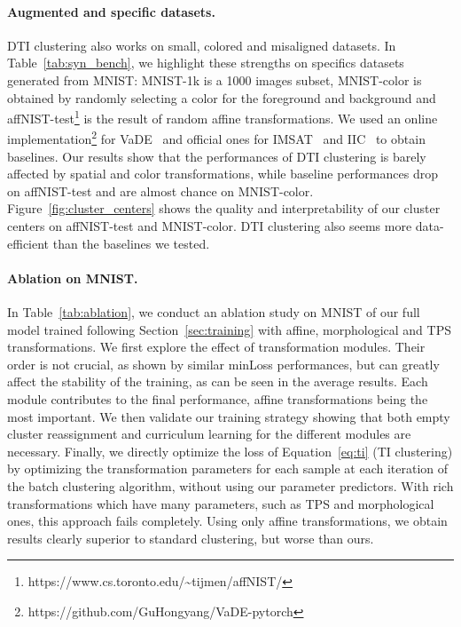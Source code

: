 \documentclass{article}
\begin{document}
\vspace{-0.7em}
\paragraph{Augmented and specific datasets.}
DTI clustering also works on small, colored and misaligned datasets. In 
Table~\ref{tab:syn_bench}, we highlight these strengths on specifics datasets generated from 
MNIST: MNIST-1k is a 1000 images subset, MNIST-color is obtained by randomly selecting a 
color for the foreground and background and 
affNIST-test\footnote{https://www.cs.toronto.edu/\textasciitilde tijmen/affNIST/} is the 
result of random affine transformations.  We used an online 
implementation\footnote{https://github.com/GuHongyang/VaDE-pytorch} for 
VaDE~\cite{jiangVariationalDeepEmbedding2017} and official ones for 
IMSAT~\cite{huLearningDiscreteRepresentations2017} and 
IIC~\cite{jiInvariantInformationClustering2019} to obtain baselines.  Our results show that 
the performances of DTI clustering is barely affected by spatial and color transformations, 
while baseline performances drop on affNIST-test and are almost chance on MNIST-color.  
Figure~\ref{fig:cluster_centers} shows the quality and interpretability of our cluster 
centers on affNIST-test and MNIST-color. DTI clustering also seems more data-efficient than 
the baselines we tested.

\vspace{-0.7em}
\paragraph{Ablation on MNIST.}
In Table~\ref{tab:ablation}, we conduct an ablation study on MNIST of our full model trained 
following Section~\ref{sec:training} with affine, morphological and TPS transformations.
We first explore the effect of transformation modules. Their order is not crucial, as shown 
by similar minLoss performances, but can greatly affect the stability of the training, as can 
be seen in the average results. Each module contributes to the final performance, affine 
transformations being the most important. We then validate our training strategy showing that 
both empty cluster reassignment and curriculum learning for the different modules are 
necessary. Finally, we directly optimize the loss of Equation~\ref{eq:ti} (TI clustering) by 
optimizing the transformation parameters for each sample at each iteration of the batch 
clustering algorithm, without using our parameter predictors. With rich transformations which 
have many parameters, such as TPS and morphological ones, this approach fails completely.  
Using only affine transformations, we obtain results clearly superior to standard 
clustering, but worse than ours.
\end{document}
